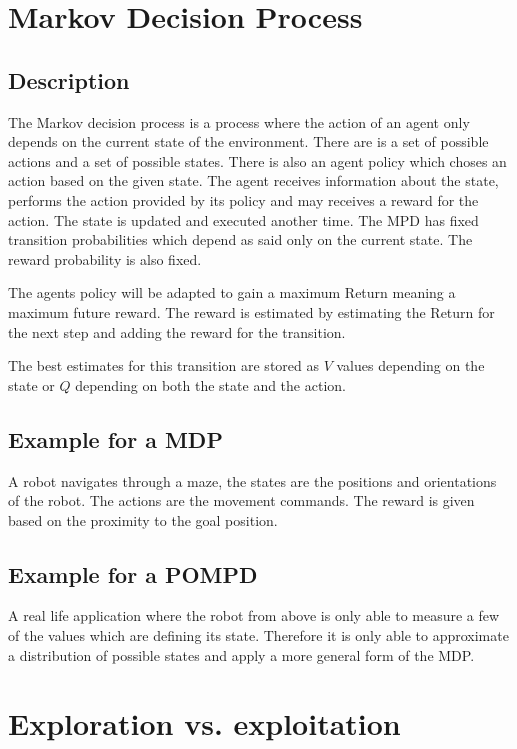 \documentclass[a4paper, 11pt]{article}
\begin{document}
\section{Markov Decision Process}
\subsection{Description}
The Markov decision process is a process where the action of an agent only depends on the current state of the environment.
There are is a set of possible actions and a set of possible states. There is also an agent policy which choses an action based on the given state.
The agent receives information about the state, performs the action provided by its policy and may receives a reward for the action. The state is updated and executed another time.
The MPD has fixed transition probabilities which depend as said only on the current state.
The reward probability is also fixed.

The agents policy will be adapted to gain a maximum Return meaning a maximum future reward.
The reward is estimated by estimating the Return for the next step and adding the reward for the transition.

The best estimates for this transition are stored as $V$ values depending on the state or $Q$ depending on both the state and the action.

\subsection{Example for a MDP}

A robot navigates through a maze, the states are the positions and orientations of the robot.
The actions are the movement commands. The reward is given based on the proximity to the goal position.


\subsection{Example for a POMPD}

A real life application where the robot from above is only able to measure a few of the values which are defining its state.
Therefore it is only able to approximate a distribution of possible states and apply a more general form of the MDP.

\section{Exploration vs. exploitation}
\end{document}
